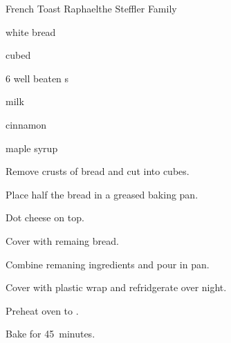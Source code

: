 \begin{recipe}{French Toast Raphael}{the Steffler Family}{}

\begin{ingredients}
\item {} white bread
\item {} cubed 
\item 6 well beaten s
\item {} milk
\item \tp{\half} cinnamon
\item {} maple syrup
\end{ingredients}

\begin{directions}
\item Remove crusts of bread and cut into  cubes.
\item Place half the bread in a greased  baking pan.
\item Dot cheese on top.
\item Cover with remaing bread.
\item Combine remaning ingredients and pour in pan.
\item Cover with plastic wrap and refridgerate over night.
\item Preheat oven to .
\item Bake for 45~minutes.
\end{directions}
\end{recipe}
